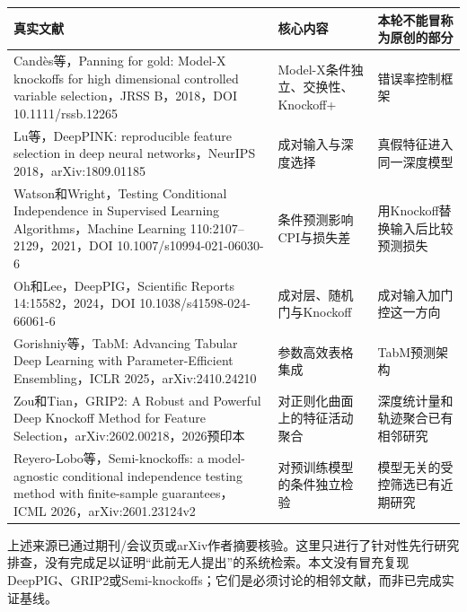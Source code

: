 \documentclass[UTF8,11pt,a4paper]{ctexart}
\begin{document}
{\def\LTcaptype{none} %
{
\footnotesize
\begin{longtable}[]{@{}
  >{\raggedright\arraybackslash}p{}
  >{\raggedright\arraybackslash}p{}
  >{\raggedright\arraybackslash}p{}@{}}
\toprule\noalign{}
\begin{minipage}[b]{\linewidth}\raggedright
真实文献
\end{minipage} & \begin{minipage}[b]{\linewidth}\raggedright
核心内容
\end{minipage} & \begin{minipage}[b]{\linewidth}\raggedright
本轮不能冒称为原创的部分
\end{minipage} \\
\midrule\noalign{}
\endhead
\bottomrule\noalign{}
\endlastfoot
Candès等，Panning for gold: Model-X knockoffs for high dimensional controlled variable selection，JRSS B，2018，DOI 10.1111/rssb.12265 & Model-X条件独立、交换性、Knockoff+ & 错误率控制框架 \\
Lu等，DeepPINK: reproducible feature selection in deep neural networks，NeurIPS 2018，arXiv:1809.01185 & 成对输入与深度选择 & 真假特征进入同一深度模型 \\
Watson和Wright，Testing Conditional Independence in Supervised Learning Algorithms，Machine Learning 110:2107--2129，2021，DOI 10.1007/s10994-021-06030-6 & 条件预测影响CPI与损失差 & 用Knockoff替换输入后比较预测损失 \\
Oh和Lee，DeepPIG，Scientific Reports 14:15582，2024，DOI 10.1038/s41598-024-66061-6 & 成对层、随机门与Knockoff & 成对输入加门控这一方向 \\
Gorishniy等，TabM: Advancing Tabular Deep Learning with Parameter-Efficient Ensembling，ICLR 2025，arXiv:2410.24210 & 参数高效表格集成 & TabM预测架构 \\
Zou和Tian，GRIP2: A Robust and Powerful Deep Knockoff Method for Feature Selection，arXiv:2602.00218，2026预印本 & 对正则化曲面上的特征活动聚合 & 深度统计量和轨迹聚合已有相邻研究 \\
Reyero-Lobo等，Semi-knockoffs: a model-agnostic conditional independence testing method with finite-sample guarantees，ICML 2026，arXiv:2601.23124v2 & 对预训练模型的条件独立检验 & 模型无关的受控筛选已有近期研究 \\
\end{longtable}
}
}

上述来源已通过期刊/会议页或arXiv作者摘要核验。这里只进行了针对性先行研究排查，没有完成足以证明``此前无人提出''的系统检索。本文没有冒充复现DeepPIG、GRIP2或Semi-knockoffs；它们是必须讨论的相邻文献，而非已完成实证基线。
\end{document}
